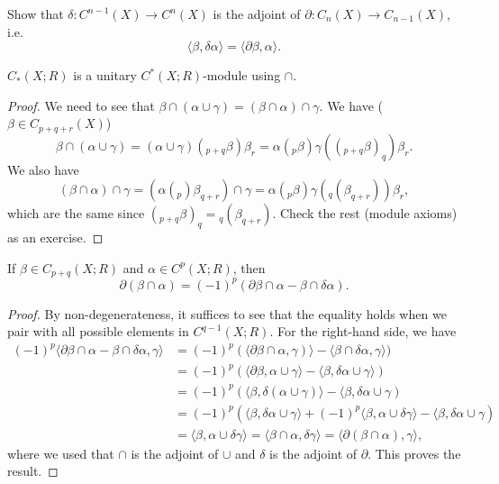 \begin{exercise}
  Show that $\delta : C^{n - 1}(X) \to C^n(X)$
  is the adjoint of $\partial : C_n(X) \to C_{n - 1}(X)$, i.e.
  \[
    \langle \beta, \delta \alpha \rangle
    = \langle \partial \beta, \alpha \rangle.
  \]
\end{exercise}

\begin{lemma}
  $C_*(X; R)$ is a unitary $C^*(X; R)$-module
  using $\cap$.
\end{lemma}

\begin{proof}
  We need to see that $\beta \cap (\alpha \cup \gamma) = (\beta \cap \alpha) \cap \gamma$.
  We have ($\beta \in C_{p + q + r}(X)$)
  \[
    \beta \cap (\alpha \cup \gamma)
    = (\alpha \cup \gamma) ({}_{p + q} \beta) \beta_r
    = \alpha ({}_p \beta) \gamma(({}_{p + q} \beta)_q) \beta_r.
  \]
  We also have
  \[
    (\beta \cap \alpha) \cap \gamma
    = (\alpha ({}_p) \beta_{q + r}) \cap \gamma
    = \alpha({}_p \beta) \gamma({}_q(\beta_{q + r})) \beta_r,
  \]
  which are the same since
  $({}_{p + q} \beta)_q = {}_q(\beta_{q + r})$.
  Check the rest (module axioms) as an exercise.
\end{proof}

\begin{lemma}
  If $\beta \in C_{p + q}(X; R)$ and
  $\alpha \in C^p(X; R)$, then
  \[\partial(\beta \cap \alpha)
    = (-1)^p (\partial \beta \cap \alpha - \beta \cap \delta \alpha).\]
\end{lemma}

\begin{proof}
  By non-degenerateness, it suffices to see
  that the equality
  holds when we pair with all possible
  elements in $C^{q - 1}(X; R)$. For the
  right-hand side, we have
  \begin{align*}
    (-1)^p \langle \partial \beta \cap \alpha - \beta \cap \delta \alpha, \gamma \rangle
    &= (-1)^p(\langle \partial \beta \cap \alpha, \gamma) \rangle - \langle \beta \cap \delta \alpha, \gamma \rangle) \\
    &= (-1)^p(\langle\partial \beta, \alpha \cup \gamma \rangle - \langle \beta, \delta \alpha \cup \gamma \rangle) \\
    &= (-1)^p(\langle \beta, \delta(\alpha \cup \gamma) \rangle - \langle \beta, \delta \alpha \cup \gamma) \\
    &= (-1)^p (\langle \beta, \delta \alpha \cup \gamma \rangle + (-1)^p \langle \beta, \alpha \cup \delta \gamma \rangle - \langle \beta, \delta \alpha \cup \gamma) \\
    &= \langle \beta, \alpha \cup \delta \gamma \rangle
    = \langle \beta \cap \alpha, \delta \gamma \rangle
    = \langle \partial(\beta \cap \alpha), \gamma \rangle,
  \end{align*}
  where we used that $\cap$ is the
  adjoint of $\cup$ and $\delta$ is the adjoint
  of $\partial$. This proves the result.
\end{proof}

